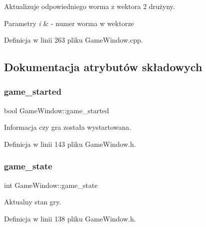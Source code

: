 Aktualizuje odpowiedniego worma z wektora 2 drużyny. 


\begin{DoxyParams}{Parametry}
{\em i} & -\/ numer worma w wektorze \\
\hline
\end{DoxyParams}


Definicja w linii 263 pliku Game\+Window.\+cpp.



\subsection{Dokumentacja atrybutów składowych}
\mbox{\label{class_game_window_a5ce0d59c491a490bc1d98afcac741016}} 
\subsubsection{\texorpdfstring{game\+\_\+started}{game\_started}}
{\footnotesize\ttfamily bool Game\+Window\+::game\+\_\+started}



Informacja czy gra została wystartowana. 



Definicja w linii 143 pliku Game\+Window.\+h.

\mbox{\label{class_game_window_aafe2b1768f704b81e4fe94115287b9f7}} 
\subsubsection{\texorpdfstring{game\+\_\+state}{game\_state}}
{\footnotesize\ttfamily int Game\+Window\+::game\+\_\+state}



Aktualny stan gry. 



Definicja w linii 138 pliku Game\+Window.\+h.

\mbox{\label{class_game_window_a3c63dc36f53ecb9b1d055923293daffd}} 

